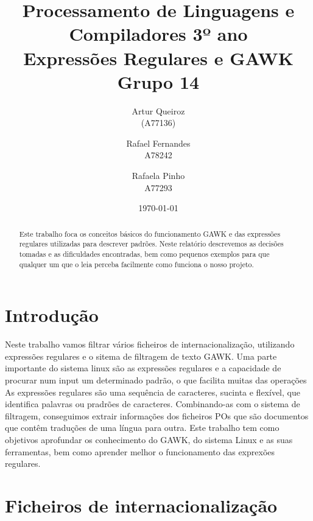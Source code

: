 \documentclass{report}
\title{Processamento de Linguagens e Compiladores 3º ano\\ \textbf{Expressões Regulares e GAWK}\\ Grupo 14}
\author{Artur Queiroz\\ (A77136) \and  Rafael Fernandes\\ A78242 \and Rafaela Pinho\\ A77293  }
\date{\today}
\begin{document}
\maketitle

\begin{abstract}
Este trabalho foca os conceitos básicos do funcionamento GAWK e das expressões regulares utilizadas para descrever padrões.
Neste relatório descrevemos as decisões tomadas e as dificuldades encontradas, bem como pequenos exemplos para que qualquer um que o leia perceba facilmente como funciona o nosso projeto.
\end{abstract}

\tableofcontents

\chapter{Introdução} \label{intro}
Neste trabalho vamos filtrar vários ficheiros de internacionalização, utilizando expressões regulares e o sitema de filtragem de texto GAWK. Uma parte importante do sistema linux são as expressões regulares e a capacidade de procurar num input um determinado padrão, o que facilita muitas das operações
As expressões regulares são uma sequência de caracteres, sucinta e flexível, que identifica palavras ou pradrões de caracteres. Combinando-as com o sistema de filtragem, conseguimos extrair informações dos ficheiros POs que são documentos que contêm traduções de uma língua para outra.
Este trabalho tem como objetivos aprofundar os conhecimento do GAWK, do sistema Linux e as suas ferramentas, bem como aprender melhor o funcionamento das exprexões regulares.


\chapter{Ficheiros de internacionalização} \label{fi}
\end{document}
